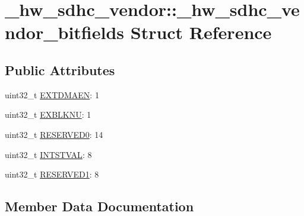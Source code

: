 \hypertarget{struct__hw__sdhc__vendor_1_1__hw__sdhc__vendor__bitfields}{}\section{\+\_\+hw\+\_\+sdhc\+\_\+vendor\+:\+:\+\_\+hw\+\_\+sdhc\+\_\+vendor\+\_\+bitfields Struct Reference}
\label{struct__hw__sdhc__vendor_1_1__hw__sdhc__vendor__bitfields}
\subsection*{Public Attributes}
\begin{DoxyCompactItemize}
\item 
uint32\+\_\+t \hyperlink{struct__hw__sdhc__vendor_1_1__hw__sdhc__vendor__bitfields_a81f57349f554108bd8d561fb8feddaa6}{E\+X\+T\+D\+M\+A\+EN}\+: 1
\item 
uint32\+\_\+t \hyperlink{struct__hw__sdhc__vendor_1_1__hw__sdhc__vendor__bitfields_a72c2dd7ba875e88838036ff5454c885a}{E\+X\+B\+L\+K\+NU}\+: 1
\item 
uint32\+\_\+t \hyperlink{struct__hw__sdhc__vendor_1_1__hw__sdhc__vendor__bitfields_ad3046b8ebe71a9d2a254b8d7cbdd5a11}{R\+E\+S\+E\+R\+V\+E\+D0}\+: 14
\item 
uint32\+\_\+t \hyperlink{struct__hw__sdhc__vendor_1_1__hw__sdhc__vendor__bitfields_ad2a5d34c69649a8b88a8965badee49fb}{I\+N\+T\+S\+T\+V\+AL}\+: 8
\item 
uint32\+\_\+t \hyperlink{struct__hw__sdhc__vendor_1_1__hw__sdhc__vendor__bitfields_a9cbd6f0785c34a126a3ca01298ad6c17}{R\+E\+S\+E\+R\+V\+E\+D1}\+: 8
\end{DoxyCompactItemize}


\subsection{Member Data Documentation}
